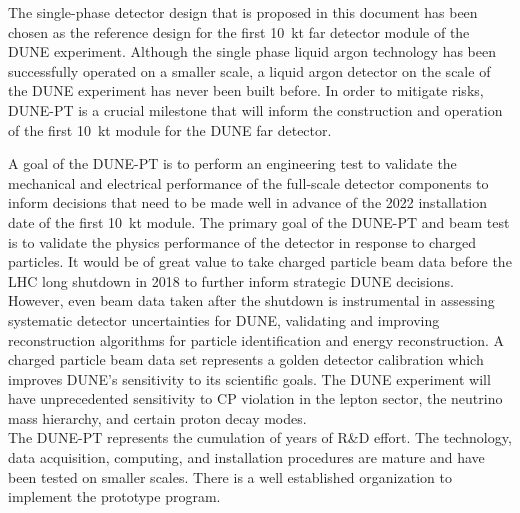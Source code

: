 \label{summary}
The single-phase detector design that is proposed in this document has been chosen as the reference design for the first 10~kt far detector module of the DUNE experiment.  Although the single phase liquid argon technology has been successfully operated on a smaller scale, a liquid argon detector on the scale of the DUNE experiment has never been built before.  In order to mitigate risks, DUNE-PT
is a crucial milestone that will inform the construction and operation of the first 10~kt module for the DUNE far detector.

A goal of the DUNE-PT is to perform an engineering test to validate the mechanical and electrical performance of the full-scale detector components to inform decisions that need to be made well in advance of the 2022 installation date of the first 10~kt module.  
The primary goal of the DUNE-PT and beam test is  to validate the physics performance of the detector in response to charged particles.
It would be of great value to take charged particle beam data before the LHC long shutdown in 2018 to further inform strategic DUNE decisions.  
However, even beam data taken after the shutdown is instrumental in assessing systematic detector uncertainties for DUNE, validating and improving reconstruction algorithms for particle identification and energy reconstruction.  
A charged particle beam data set represents a golden detector calibration which improves DUNE's sensitivity to its scientific goals. 
The DUNE experiment will have unprecedented sensitivity to CP violation in the lepton sector, the neutrino mass hierarchy, and certain proton decay modes.   \\
%
The DUNE-PT represents the cumulation of years of R\&D effort.  The technology, data acquisition, computing, and installation procedures are mature and have been tested on smaller scales.  There is a well established organization to implement the prototype program.  


